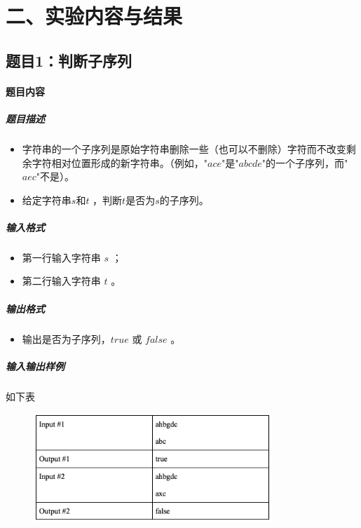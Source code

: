 \documentclass[12pt,a4paper]{ctexart}
\begin{document}
\vspace{5pt}

\section*{二、实验内容与结果}
\subsection*{题目1：判断子序列}
\paragraph{题目内容}
\subparagraph{题目描述}
\begin{itemize}
    \item 字符串的一个子序列是原始字符串删除一些（也可以不删除）字符而不改变剩余字符相对位置形成的新字符串。（例如，"$ace$"是"$abcde$"的一个子序列，而"$aec$"不是）。
    \item 给定字符串$s$和$t$ ，判断$t$是否为$s$的子序列。
\end{itemize}

\subparagraph{输入格式}
    \begin{itemize}
        \item 第一行输入字符串 $s$ ；
        \item 第二行输入字符串 $t$ 。
    \end{itemize}
\subparagraph{输出格式}
    \begin{itemize}
        \item 输出是否为子序列，$true$ 或 $false$ 。
    \end{itemize}

\subparagraph{输入输出样例}
如下表
    \begin{figure}[h]
        \centering
        \includegraphics[width=0.80\textwidth]{q1_iodata.png}
    \end{figure}

\vspace{5pt}
\end{document}
